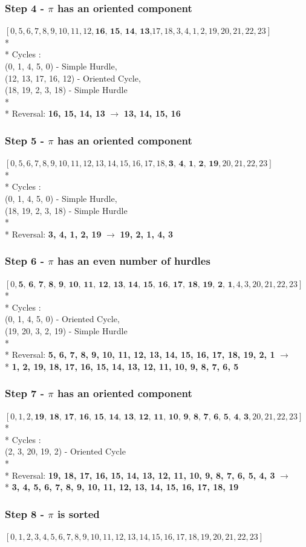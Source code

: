 \documentclass[10pt]{article}
\begin{document}
\subsubsection*{Step 4 - $\pi$ has an oriented component}
$[0, 5, 6, 7, 8, 9, 10, 11, 12, \textbf{16, 15, 14, 13,} 17, 18, 3, 4, 1, 2, 19, 20, 21, 22, 23]$
\\*
\\*
Cycles :\\(0, 1, 4, 5, 0) - Simple Hurdle,
        \\(12, 13, 17, 16, 12) - Oriented Cycle,
        \\(18, 19, 2, 3, 18) - Simple Hurdle
\\*
\\* 
Reversal: \textbf{16, 15, 14, 13} $\rightarrow$ \textbf{13, 14, 15, 16}
\subsubsection*{Step 5 - $\pi$ has an oriented component}
$[0, 5, 6, 7, 8, 9, 10, 11, 12, 13, 14, 15, 16, 17, 18, \textbf{3, 4, 1, 2, 19}, 20, 21, 22, 23]$
\\*
\\*
Cycles :\\(0, 1, 4, 5, 0) - Simple Hurdle,
        \\(18, 19, 2, 3, 18) - Simple Hurdle
\\*
\\*
Reversal: \textbf{3, 4, 1, 2, 19} $\rightarrow$ \textbf{19, 2, 1, 4, 3}
\subsubsection*{Step 6 - $\pi$ has an even number of hurdles}
$[0, \textbf{5, 6, 7, 8, 9, 10, 11, 12, 13, 14, 15, 16, 17, 18, 19, 2, 1}, 4, 3, 20, 21, 22, 23]$
\\*
\\*
Cycles :\\(0, 1, 4, 5, 0) - Oriented Cycle,
        \\(19, 20, 3, 2, 19) - Simple Hurdle
\\*
\\*
Reversal: \textbf{5, 6, 7, 8, 9, 10, 11, 12, 13, 14, 15, 16, 17, 18, 19, 2, 1} $\rightarrow$
\\* \textbf{1, 2, 19, 18, 17, 16, 15, 14, 13, 12, 11, 10, 9, 8, 7, 6, 5}
\subsubsection*{Step 7 - $\pi$ has an oriented component}
$[0, 1, 2, \textbf{19, 18, 17, 16, 15, 14, 13, 12, 11, 10, 9, 8, 7, 6, 5, 4, 3}, 20, 21, 22, 23]$
\\*
\\*
Cycles :\\(2, 3, 20, 19, 2) - Oriented Cycle
\\*
\\*
Reversal: \textbf{19, 18, 17, 16, 15, 14, 13, 12, 11, 10, 9, 8, 7, 6, 5, 4, 3} $\rightarrow$
\\* \textbf{3, 4, 5, 6, 7, 8, 9, 10, 11, 12, 13, 14, 15, 16, 17, 18, 19}
\subsubsection*{Step 8 - $\pi$ is sorted}
$[0, 1, 2, 3, 4, 5, 6, 7, 8, 9, 10, 11, 12, 13, 14, 15, 16, 17, 18, 19, 20, 21, 22, 23]$

\nocite{*}


\end{document}
